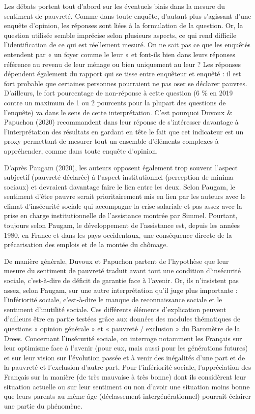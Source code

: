 \documentclass[12pt,a4paper]{reedthesis}
\begin{document}
Les débats portent tout d'abord sur les éventuels biais dans la mesure du sentiment de pauvreté. Comme dans toute enquête, d'autant plus s'agissant d'une enquête d'opinion, les réponses sont liées à la formulation de la question. Or, la question utilisée semble imprécise selon plusieurs aspects, ce qui rend difficile l'identification de ce qui est réellement mesuré. On ne sait pas ce que les enquêtés entendent par « un foyer comme le leur » et font-ils bien dans leurs réponses référence au revenu de leur ménage ou bien uniquement au leur ? Les réponses dépendent également du rapport qui se tisse entre enquêteur et enquêté : il est fort probable que certaines personnes pourraient ne pas oser se déclarer pauvres. D'ailleurs, le fort pourcentage de non-réponse à cette question (6 \% en 2019 contre un maximum de 1 ou 2 pourcents pour la plupart des questions de l'enquête) va dans le sens de cette interprétation. C'est pourquoi Duvoux \& Papuchon (2020) recommandent dans leur réponse de s'intéresser davantage à l'interprétation des résultats en gardant en tête le fait que cet indicateur est un proxy permettant de mesurer tout un ensemble d'éléments complexes à appréhender, comme dans toute enquête d'opinion.

D'après Paugam (2020), les auteurs opposent également trop souvent l'aspect subjectif (pauvreté déclarée) à l'aspect institutionnel (perception de minima sociaux) et devraient davantage faire le lien entre les deux. Selon Paugam, le sentiment d'être pauvre serait prioritairement mis en lien par les auteurs avec le climat d'insécurité sociale qui accompagne la crise salariale et pas assez avec la prise en charge institutionnelle de l'assistance montrée par Simmel. Pourtant, toujours selon Paugam, le développement de l'assistance est, depuis les années 1980, en France et dans les pays occidentaux, une conséquence directe de la précarisation des emplois et de la montée du chômage.

De manière générale, Duvoux et Papuchon partent de l'hypothèse que leur mesure du sentiment de pauvreté traduit avant tout une condition d'insécurité sociale, c'est-à-dire de déficit de garantie face à l'avenir. Or, ils n'insistent pas assez, selon Paugam, sur une autre interprétation qu'il juge plus importante : l'infériorité sociale, c'est-à-dire le manque de reconnaissance sociale et le sentiment d'inutilité sociale. Ces différents éléments d'explication peuvent d'ailleurs être en partie testées grâce aux données des modules thématiques de questions « opinion générale » et « pauvreté / exclusion » du Baromètre de la Drees. Concernant l'insécurité sociale, on interroge notamment les Français sur leur optimisme face à l'avenir (pour eux, mais aussi pour les générations futures) et sur leur vision sur l'évolution passée et à venir des inégalités d'une part et de la pauvreté et l'exclusion d'autre part. Pour l'infériorité sociale, l'appréciation des Français sur la manière (de très mauvaise à très bonne) dont ils considèrent leur situation actuelle ou sur leur sentiment ou non d'avoir une situation moins bonne que leurs parents au même âge (déclassement intergénérationnel) pourrait éclairer une partie du phénomène.
\end{document}
